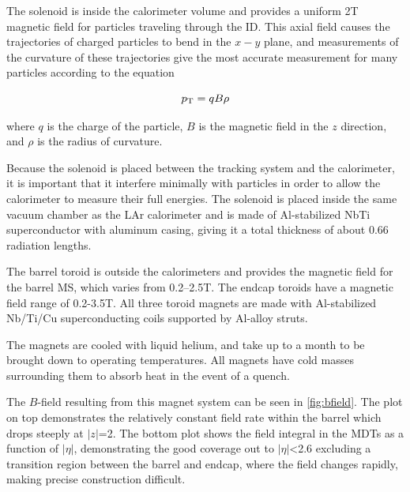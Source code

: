 The solenoid is inside the calorimeter volume and provides a uniform 2T magnetic field for particles traveling through the \ac{ID}. This axial field causes the trajectories of charged particles to bend in the $x-y$ plane, and measurements of the curvature of these trajectories give the most accurate \pt measurement for many particles according to the equation

\begin{equation}
p_{\text{T}} = qB\rho 
\end{equation}

where $q$ is the charge of the particle, $B$ is the magnetic field in the $z$ direction, and $\rho$ is the radius of curvature. 

Because the solenoid is placed between the tracking system and the calorimeter, it is important that it interfere minimally with particles in order to allow the calorimeter to measure their full energies. The solenoid is placed inside the same vacuum chamber as the LAr calorimeter and is made of Al-stabilized NbTi superconductor with aluminum casing, giving it a total thickness of about 0.66 radiation lengths. 

The barrel toroid is outside the calorimeters and provides the magnetic field for the barrel \ac{MS}, which varies from 0.2–2.5T. The endcap toroids have a magnetic field range of 0.2-3.5T. All three toroid magnets are made with Al-stabilized Nb/Ti/Cu superconducting coils supported by Al-alloy struts. 

The magnets are cooled with liquid helium, and take up to a month to be brought down to operating temperatures. All magnets have cold masses surrounding them to absorb heat in the event of a quench. 

The $B$-field resulting from this magnet system can be seen in \autoref{fig:bfield}. The plot on top demonstrates the relatively constant field rate within the barrel which drops steeply at $|z|$=2. The bottom plot shows the field integral in the \acp{MDT} as a function of $|\eta|$, demonstrating the good coverage out to $|\eta|$<2.6 excluding a transition region between the barrel and endcap, where the field changes rapidly, making precise \pt construction difficult. 

